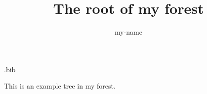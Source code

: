 \documentclass[oneside,a4paper]{book}%
\title{The root of my forest}\author{my-name}
\theoremstyle{definition}%
\begin{document}
\begin{filecontents*}[overwrite]{\jobname.bib}

\end{filecontents*}
\frontmatter\maketitle\tableofcontents\mainmatter\par{}This is an example tree in my forest.\backmatter\nocite{*}
\end{document}
